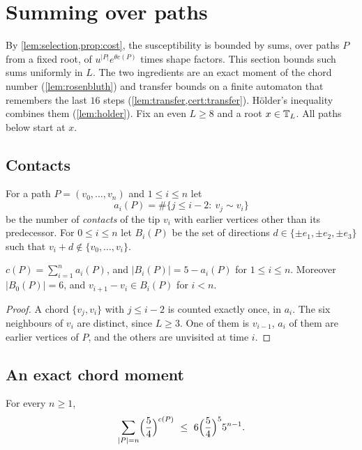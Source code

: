 \section{Summing over paths}\label{sec:counting}

By \cref{lem:selection,prop:cost}, the susceptibility is bounded by sums, over paths $P$ from a fixed root, of $u^{|P|}e^{\theta c(P)}$ times shape factors. This section bounds such sums uniformly in $L$. The two ingredients are an exact moment of the chord number (\cref{lem:rosenbluth}) and transfer bounds on a finite automaton that remembers the last $16$ steps (\cref{lem:transfer,cert:transfer}). H\"older's inequality combines them (\cref{lem:holder}). Fix an even $L\ge8$ and a root $x\in\mathbb T_L$. All paths below start at $x$.

\subsection{Contacts}

For a path $P=(v_0,\dots,v_n)$ and $1\le i\le n$ let
\[
 a_i(P)=\#\{j\le i-2:\ v_j\sim v_i\}
\]
be the number of \emph{contacts} of the tip $v_i$ with earlier vertices other than its predecessor. For $0\le i\le n$ let $B_i(P)$ be the set of directions $d\in\{\pm e_1,\pm e_2,\pm e_3\}$ such that $v_i+d\notin\{v_0,\dots,v_i\}$.

\begin{lemma}\label{lem:contacts}
$c(P)=\sum_{i=1}^na_i(P)$, and $|B_i(P)|=5-a_i(P)$ for $1\le i\le n$. Moreover $|B_0(P)|=6$, and $v_{i+1}-v_i\in B_i(P)$ for $i<n$.
\end{lemma}

\begin{proof}
A chord $\{v_j,v_i\}$ with $j\le i-2$ is counted exactly once, in $a_i$. The six neighbours of $v_i$ are distinct, since $L\ge3$. One of them is $v_{i-1}$, $a_i$ of them are earlier vertices of $P$, and the others are unvisited at time $i$.
\end{proof}

\subsection{An exact chord moment}

\begin{lemma}\label{lem:rosenbluth}
For every $n\ge1$,
\[
 \sum_{|P|=n}\Bigl(\frac54\Bigr)^{c(P)}\ \le\ 6\Bigl(\frac54\Bigr)^5 5^{n-1}.
\]
\end{lemma}

